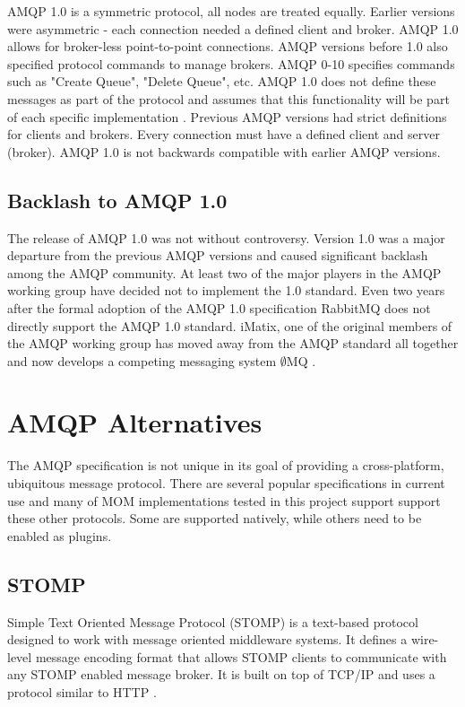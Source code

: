 \documentclass{thesis}
\begin{document}
AMQP 1.0 is a symmetric protocol, all nodes are treated equally.  Earlier versions were asymmetric - each connection needed a defined client and broker.  AMQP 1.0 allows for broker-less point-to-point connections.  AMQP versions before 1.0 also specified protocol commands to manage brokers.  AMQP 0-10 specifies commands such as "Create Queue", "Delete Queue", etc.  AMQP 1.0 does not define these messages as part of the protocol and assumes that this functionality will be part of each specific implementation \cite{REDHAT1}.  Previous AMQP versions had strict definitions for clients and brokers.  Every connection must have a defined client and server (broker).  AMQP 1.0 is not backwards compatible with earlier AMQP versions\cite{AMQP_VERSION_COMPATIBILITY}.

\subsection{Backlash to AMQP 1.0}
The release of AMQP 1.0 was not without controversy.  Version 1.0 was a major departure from the previous AMQP versions and caused significant backlash among the AMQP community.  At least two of the major players in the AMQP working group have decided not to implement the 1.0 standard.  Even two years after the formal adoption of the AMQP 1.0 specification RabbitMQ does not directly support the AMQP 1.0 standard.  iMatix, one of the original members of the AMQP working group has moved away from the AMQP standard all together and now develops a competing messaging system $\emptyset$MQ \cite{ZERO_MQ, openamq-eol}. 

\section{AMQP Alternatives}
The AMQP specification is not unique in its goal of providing a cross-platform, ubiquitous message protocol.  There are several popular specifications in current use and many of MOM implementations tested in this project support support these other protocols.  Some are supported natively, while others need to be enabled as plugins.   

\subsection{STOMP}
Simple Text Oriented Message Protocol (STOMP) is a text-based protocol designed to work with message oriented middleware systems.  It defines a wire-level message encoding format that allows STOMP clients to communicate with any STOMP enabled message broker.  It is built on top of TCP/IP and uses a protocol similar to HTTP \cite{STOMP}.
\end{document}
